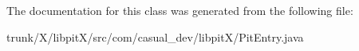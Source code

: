 The documentation for this class was generated from the following file\-:\begin{DoxyCompactItemize}
\item 
trunk/\-X/libpit\-X/src/com/casual\-\_\-dev/libpit\-X/Pit\-Entry.\-java\end{DoxyCompactItemize}
